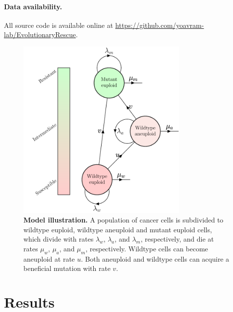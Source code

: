 \documentclass[12pt]{extarticle}
\begin{document}
\paragraph{Data availability.} All source code is available online at \url{https://github.com/yoavram-lab/EvolutionaryRescue}.



\begin{figure}
\centering
\includegraphics[width=0.75\textwidth]{Figures/figureAneuploidy.pdf}


\caption{\textbf{Model illustration.}
A population of cancer cells is subdivided to wildtype euploid, wildtype aneuploid and mutant euploid cells, which divide with rates $\lambda_w$, $\lambda_a$, and $\lambda_m$, respectively, and die at rates $\mu_w$, $\mu_a$, and $\mu_m$, respectively. 
Wildtype cells can become aneuploid at rate $u$. Both aneuploid and wildtype cells can acquire a beneficial mutation with rate $v$.}
\label{figureAneuploidy}
\end{figure}


\section*{Results}
\end{document}
